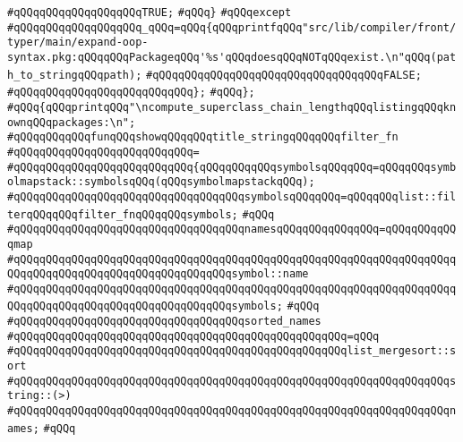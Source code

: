 \verb|#qQQqqQQqqQQqqQQqqQQqTRUE;|\newline
\verb|#qQQq}|\newline
\verb|#qQQqexcept|\newline
\verb|#qQQqqQQqqQQqqQQqqQQq_qQQq=qQQq{qQQqprintfqQQq"src/lib/compiler/front/typer/main/expand-oop-syntax.pkg:qQQqqQQqPackageqQQq'%s'qQQqdoesqQQqNOTqQQqexist.\n"qQQq(path_to_stringqQQqpath);|\newline
\verb|#qQQqqQQqqQQqqQQqqQQqqQQqqQQqqQQqqQQqFALSE;|\newline
\verb|#qQQqqQQqqQQqqQQqqQQqqQQqqQQq};|\newline
\verb|#qQQq};|\newline
\verb|#qQQq{qQQqprintqQQq"\ncompute_superclass_chain_lengthqQQqlistingqQQqknownqQQqpackages:\n";|\newline
\verb|#qQQqqQQqqQQqfunqQQqshowqQQqqQQqtitle_stringqQQqqQQqfilter_fn|\newline
\verb|#qQQqqQQqqQQqqQQqqQQqqQQqqQQq=|\newline
\verb|#qQQqqQQqqQQqqQQqqQQqqQQqqQQq{qQQqqQQqqQQqsymbolsqQQqqQQq=qQQqqQQqsymbolmapstack::symbolsqQQq(qQQqsymbolmapstackqQQq);|\newline
\verb|#qQQqqQQqqQQqqQQqqQQqqQQqqQQqqQQqqQQqsymbolsqQQqqQQq=qQQqqQQqlist::filterqQQqqQQqfilter_fnqQQqqQQqsymbols;|\newline
\verb|#qQQq|\newline
\verb|#qQQqqQQqqQQqqQQqqQQqqQQqqQQqqQQqqQQqnamesqQQqqQQqqQQqqQQq=qQQqqQQqqQQqmap|\newline
\verb|#qQQqqQQqqQQqqQQqqQQqqQQqqQQqqQQqqQQqqQQqqQQqqQQqqQQqqQQqqQQqqQQqqQQqqQQqqQQqqQQqqQQqqQQqqQQqqQQqqQQqqQQqsymbol::name|\newline
\verb|#qQQqqQQqqQQqqQQqqQQqqQQqqQQqqQQqqQQqqQQqqQQqqQQqqQQqqQQqqQQqqQQqqQQqqQQqqQQqqQQqqQQqqQQqqQQqqQQqqQQqqQQqsymbols;|\newline
\verb|#qQQq|\newline
\verb|#qQQqqQQqqQQqqQQqqQQqqQQqqQQqqQQqqQQqsorted_names|\newline
\verb|#qQQqqQQqqQQqqQQqqQQqqQQqqQQqqQQqqQQqqQQqqQQqqQQqqQQq=qQQq|\newline
\verb|#qQQqqQQqqQQqqQQqqQQqqQQqqQQqqQQqqQQqqQQqqQQqqQQqqQQqlist_mergesort::sort|\newline
\verb|#qQQqqQQqqQQqqQQqqQQqqQQqqQQqqQQqqQQqqQQqqQQqqQQqqQQqqQQqqQQqqQQqqQQqstring::(>)|\newline
\verb|#qQQqqQQqqQQqqQQqqQQqqQQqqQQqqQQqqQQqqQQqqQQqqQQqqQQqqQQqqQQqqQQqqQQqnames;|\newline
\verb|#qQQq|\newline
